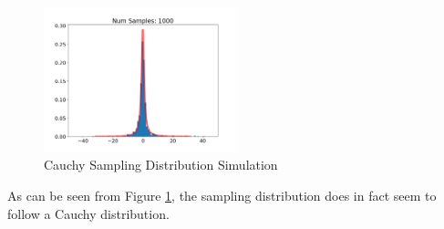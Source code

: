 
\begin{figure}[ht]
    \centering
    \includegraphics[width=0.5\textwidth]{figs/cauchy_sampling_dist.png}
    \caption{Cauchy Sampling Distribution Simulation}
    \label{fig:cauchy_samp_dist}
\end{figure}

As can be seen from Figure \ref{fig:cauchy_samp_dist}, the sampling distribution does in fact seem to follow a Cauchy distribution.




